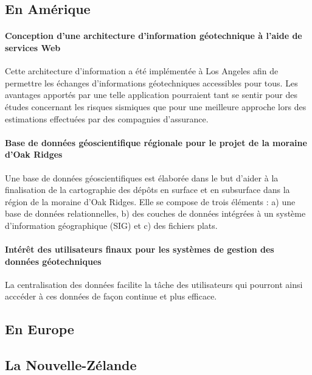         \subsection{En Amérique}
        \paragraph{Conception d'une architecture d'information géotechnique à l'aide de services Web}
        Cette architecture d'information a été implémentée à Los Angeles afin de permettre les échanges 
        d'informations géotechniques accessibles pour tous. Les avantages apportés par une telle 
        application pourraient tant se sentir pour des études concernant les risques sismiques que pour 
        une meilleure approche lors des estimations effectuées par des compagnies d'assurance. 
        \cite{zimmermann2003design}
        \paragraph{Base de données géoscientifique régionale pour le projet de la moraine d'Oak Ridges}
        Une base de données géoscientifiques est élaborée dans le but d’aider à la finalisation de la 
        cartographie des dépôts en surface et en subsurface dans la région de la moraine d’Oak 
        Ridges. Elle se compose de trois éléments : a) une base de données relationnelles, 
        b) des couches de données intégrées à un système d’information géographique (SIG) 
        et c) des fichiers plats.
        \cite{russell1996regional}
        \paragraph{Intérêt des utilisateurs finaux pour les systèmes de gestion des données géotechniques}
        La centralisation des données facilite la tâche des utilisateurs qui pourront ainsi acccéder à ces
        données de façon continue et plus efficace.
        \cite{Turner2008}

        \subsection{En Europe}
        \cite{antoljak2012subsurface}
       
        \lipsum[1]
        \subsection{La Nouvelle-Zélande}
